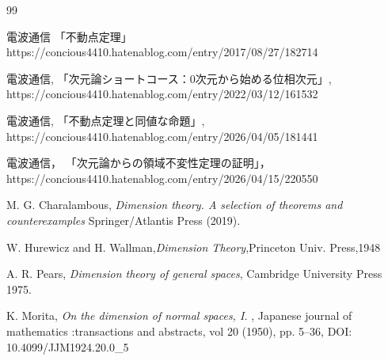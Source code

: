 \documentclass[leqno, a4paper, 12pt]{jsarticle}
\numberwithin{equation}{section}
\begin{document}
\begin{thebibliography}{99}

電波通信
「不動点定理」
https://concious4410.hatenablog.com/entry/2017/08/27/182714




電波通信, 「次元論ショートコース：0次元から始める位相次元」, 
https://concious4410.hatenablog.com/entry/2022/03/12/161532


電波通信, 「不動点定理と同値な命題」, 
https://concious4410.hatenablog.com/entry/2026/04/05/181441

電波通信，
「次元論からの領域不変性定理の証明」，
https://concious4410.hatenablog.com/entry/2026/04/15/220550

M. G. Charalambous, 
\textit{Dimension theory. A selection of theorems and counterexamples} Springer/Atlantis Press (2019). 

W. Hurewicz and H. Wallman,\textit{Dimension Theory},Princeton Univ. Press,1948

 A. R. 
 Pears,
 \textit{Dimension theory of general spaces}, 
 {Cambridge} {University} {Press}
1975. 

K. Morita, 
\textit{On the dimension of normal spaces, I. }, 
Japanese journal of mathematics :transactions and abstracts, 
vol 20
(1950), 
pp. 5--36, 
DOI: 
10.4099/JJM1924.20.0\_5


\end{thebibliography}




			
\end{document}
